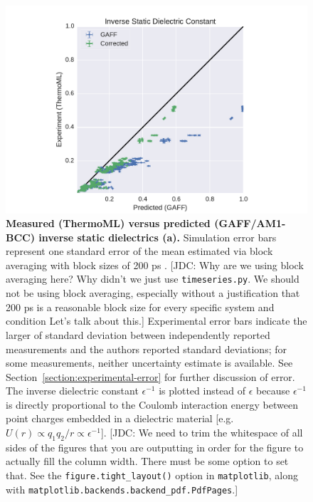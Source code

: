 \documentclass[aps,pre,twocolumn,nofootinbib,superscriptaddress,linenumbers]{revtex4-1}
\begin{document}

\begin{figure}
\includegraphics[width=\columnwidth]{./figures/dielectrics_thermoml.pdf}

\caption{{\bf Measured (ThermoML) versus predicted (GAFF/AM1-BCC) inverse static dielectrics (a).}
Simulation error bars represent one standard error of the mean estimated via block averaging with block sizes of 200 ps \cite{flyvbjerg1989error}.  
{\color{red}[JDC: Why are we using block averaging here?  Why didn't we just use {\tt timeseries.py}. We should not be using block averaging, especially without a justification that 200 ps is a reasonable block size for every specific system and condition  Let's talk about this.]}
Experimental error bars indicate the larger of standard deviation between independently reported measurements and the authors reported standard deviations; for some measurements, neither uncertainty estimate is available.  
See Section~\ref{section:experimental-error} for further discussion of error.  
The inverse dielectric constant $\epsilon^{-1}$ is plotted instead of $\epsilon$ because $\epsilon^{-1}$ is directly proportional to the Coulomb interaction energy between point charges embedded in a dielectric material [e.g. $U(r) \propto q_1 q_2 / r \propto \epsilon^{-1}$].
{\color{red}[JDC: We need to trim the whitespace of all sides of the figures that you are outputting in order for the figure to actually fill the column width.  There must be some option to set that.  See the {\tt figure.tight\_layout()} option in {\tt matplotlib}, along with {\tt matplotlib.backends.backend\_pdf.PdfPages}.]}
}
\label{figure:Dielectric}
\end{figure}
\end{document}
